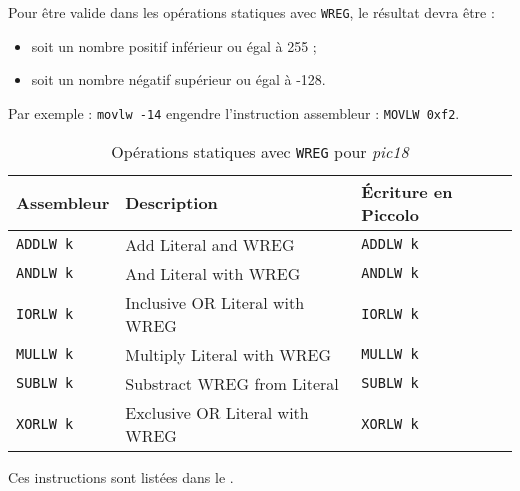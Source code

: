 Pour être valide dans les opérations statiques avec \texttt{WREG}, le résultat devra être :
\begin{itemize}
  \item soit un nombre positif inférieur ou égal à 255 ;
  \item soit un nombre négatif supérieur ou égal à -128.
\end{itemize}

Par exemple : \texttt{movlw -14} engendre l’instruction assembleur : \texttt{MOVLW 0xf2}.


\begin{table}[!ht]
  \centering
  \small
  \begin{tabular}{lll}
    \textbf{Assembleur} & \textbf{Description} & \textbf{Écriture en Piccolo}\\
    \hline
    \texttt{ADDLW k} & Add Literal and WREG & \texttt{ADDLW k}\\
    \texttt{ANDLW k} & And Literal with WREG & \texttt{ANDLW k}\\
    \texttt{IORLW k} & Inclusive OR Literal with WREG & \texttt{IORLW k}\\
    \texttt{MULLW k} & Multiply Literal with WREG & \texttt{MULLW k}\\
    \texttt{SUBLW k} & Substract WREG from Literal & \texttt{SUBLW k}\\
    \texttt{XORLW k} & Exclusive OR Literal with WREG & \texttt{XORLW k}\\
    \hline
  \end{tabular}
  \caption{Opérations statiques avec \texttt{WREG} pour \emph{pic18}}
\end{table}



Ces instructions sont listées dans le .

